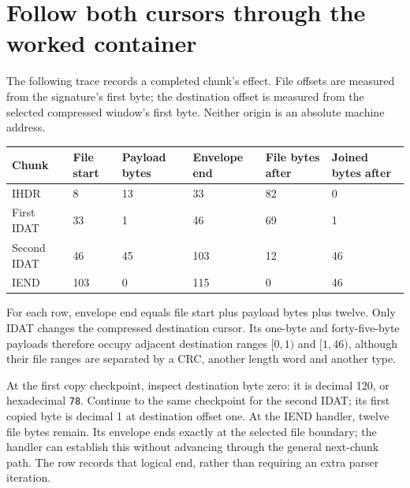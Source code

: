 \section{Follow both cursors through the worked container}
The following trace records a completed chunk's effect. File offsets are measured
from the signature's first byte; the destination offset is measured from the selected
compressed window's first byte. Neither origin is an absolute machine address.

\begin{longtable}{p{20mm}p{19mm}p{22mm}p{24mm}p{26mm}p{30mm}}
  \toprule Chunk & File start & Payload bytes & Envelope end & File bytes after & Joined bytes after \\\midrule
  IHDR           & 8          & 13            & 33           & 82               & 0                  \\
  First IDAT     & 33         & 1             & 46           & 69               & 1                  \\
  Second IDAT    & 46         & 45            & 103          & 12               & 46                 \\
  IEND           & 103        & 0             & 115          & 0                & 46                 \\\bottomrule
\end{longtable}
For each row, envelope end equals file start plus payload bytes plus twelve. Only
IDAT changes the compressed destination cursor. Its one-byte and forty-five-byte
payloads therefore occupy adjacent destination ranges $[0,1)$ and $[1,46)$, although
their file ranges are separated by a CRC, another length word and another type.

At the first copy checkpoint, inspect destination byte zero: it is decimal 120,
or hexadecimal \texttt{78}. Continue to the same checkpoint for the second IDAT;
its first copied byte is decimal 1 at destination offset one. At the IEND handler,
twelve file bytes remain. Its envelope ends exactly at the selected file boundary;
the handler can establish this without advancing through the general next-chunk path.
The row records that logical end, rather than requiring an extra parser iteration.
